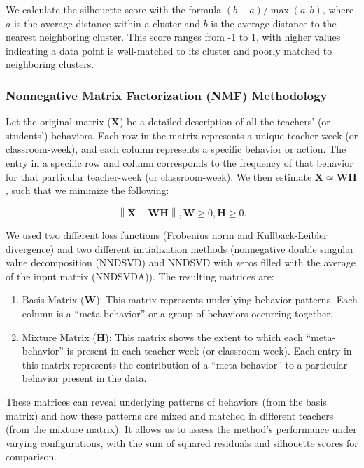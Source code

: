 \documentclass[
  number,
  preprint,
  3p,
  onecolumn]{elsarticle}
\providecommand{\tightlist}{%
  \setlength{\itemsep}{0pt}\setlength{\parskip}{0pt}}\usepackage{longtable,booktabs,array}
\begin{document}
We calculate the silhouette score with the formula
\((b - a) / \max(a, b)\), where \(a\) is the average distance within a
cluster and \(b\) is the average distance to the nearest neighboring
cluster. This score ranges from -1 to 1, with higher values indicating a
data point is well-matched to its cluster and poorly matched to
neighboring clusters.

\subsubsection{Nonnegative Matrix Factorization (NMF)
Methodology}\label{nonnegative-matrix-factorization-nmf-methodology}

Let the original matrix (\(\mathbf{X}\)) be a detailed description of
all the teachers' (or students') behaviors. Each row in the matrix
represents a unique teacher-week (or classroom-week), and each column
represents a specific behavior or action. The entry in a specific row
and column corresponds to the frequency of that behavior for that
particular teacher-week (or classroom-week). We then estimate
\(\mathbf{X} \simeq \mathbf{W}\mathbf{H}\), such that we minimize the
following:

\[
\left\| \mathbf{X} - \mathbf{W}\mathbf{H} \right\| , \mathbf{W} \geq 0, \mathbf{H} \geq 0.
\]

We used two different loss functions (Frobenius norm and
Kullback-Leibler divergence) and two different initialization methods
(nonnegative double singular value decomposition (NNDSVD) and NNDSVD
with zeros filled with the average of the input matrix (NNDSVDA)). The
resulting matrices are:

\begin{enumerate}
\def\labelenumi{\arabic{enumi}.}
\tightlist
\item
  Basis Matrix (\(\mathbf{W}\)): This matrix represents underlying
  behavior patterns. Each column is a ``meta-behavior'' or a group of
  behaviors occurring together.
\item
  Mixture Matrix (\(\mathbf{H}\)): This matrix shows the extent to which
  each ``meta-behavior'' is present in each teacher-week (or
  classroom-week). Each entry in this matrix represents the contribution
  of a ``meta-behavior'' to a particular behavior present in the data.
\end{enumerate}

These matrices can reveal underlying patterns of behaviors (from the
basis matrix) and how these patterns are mixed and matched in different
teachers (from the mixture matrix). It allows us to assess the method's
performance under varying configurations, with the sum of squared
residuals and silhouette scores for comparison.
\end{document}
